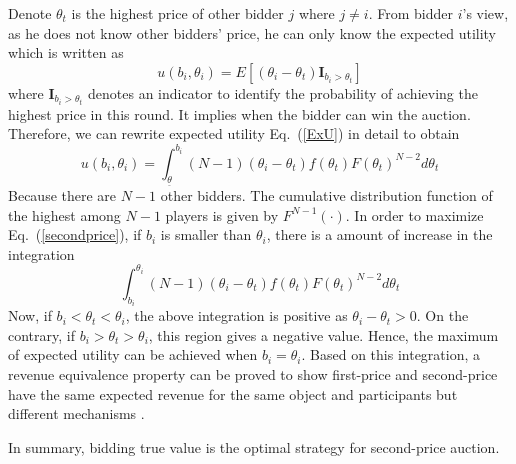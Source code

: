 Denote $\theta_t$ is the highest price of other bidder $j$ where $j \neq i$. From bidder $i$'s view, as he does not know other bidders' price, he can only know the expected utility which is written as
\begin{equation}
\label{ExU}
u(b_i, \theta_i) = E [ (\theta_i - \theta_t) \bm{I}_{b_{i} > \theta_t} ]
\end{equation}
where $\bm{I}_{b_{i} > \theta_t}$  denotes an indicator to identify the probability of achieving the highest price in this round. It implies when the bidder can win the auction. Therefore, we can rewrite expected utility Eq.~(\ref{ExU}) in detail to obtain
\begin{equation}
\label{secondprice}
u(b_i, \theta_i)=\int_{\underline{\theta}}^{b_i}(N-1)(\theta_i-\theta_t)f(\theta_t)F(\theta_t)^{N-2}d\theta_t
\end{equation}
Because there are $N-1$ other bidders. The cumulative distribution function of the highest among $N-1$ players is given by $F^{N-1}(\cdot)$.
In order to maximize Eq.~(\ref{secondprice}), if $b_i$ is smaller than $\theta_i$, there is a amount  of increase in the integration
\begin{equation}
\int_{b_i}^{\theta_i}(N-1)(\theta_i - \theta_t)f(\theta_t)F(\theta_t)^{N-2}d\theta_t
\end{equation}
Now, if $b_i < \theta_t < \theta_i$, the above integration is positive as $\theta_i-\theta_t > 0$. On the contrary, if $b_i > \theta_t > \theta_i$, this region gives a negative value. Hence, the maximum of expected utility can be achieved when $b_i=\theta_i$. Based on this integration, a revenue equivalence property can be proved to show first-price and second-price have the same expected revenue for the same object and participants but different mechanisms \cite{menezes2005introduction}.

In summary, bidding true value is the optimal strategy for second-price auction. 





